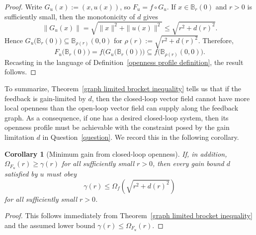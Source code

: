 \documentclass[pdflatex,sn-mathphys-num]{sn-jnl}%
\theoremstyle{thmstyleone}%
\newtheorem{corollary}[theorem]{Corollary}
\theoremstyle{thmstyletwo}%
\theoremstyle{thmstylethree}%
\begin{document}
    
    
    \begin{proof}
        Write $G_u(x):=(x,u(x))$, so $F_u=f \circ G_u$.  If $x \in \mathbb{B}_r(0)$ and $r>0$ is sufficiently small, then the monotonicity of $d$ gives
        \[
            \|G_u(x)\|=\sqrt{\|x\|^2+\|u(x)\|^2}\leq \sqrt{r^2+d(r)^2}.
        \]
        Hence $G_u\big(\mathbb{B}_r(0)\big) \subseteq \mathbb{B}_{\rho(r)}(0,0)$ for $\rho(r):=\sqrt{r^2+d(r)^2}$.  Therefore,
        \[
            F_u\big(\mathbb{B}_r(0)\big)=f\big(G_u\big(\mathbb{B}_r(0)\big)\big) \subseteq f\big(\mathbb{B}_{\rho(r)}(0,0)\big).
        \]
        Recasting in the language of Definition~\ref{openness profile definition}, the result follows.
    \end{proof}
    

    To summarize, Theorem~\ref{graph limited brocket inequality} tells us that if the feedback is gain-limited by $d$, then the closed-loop vector field cannot have more local openness than the open-loop vector field can supply along the feedback graph. As a consequence, if one has a desired closed-loop system, then its openness profile must be achievable with the constraint posed by the gain limitation $d$ in Question~\ref{question}.  We record this in the following corollary.
    
    
    \begin{corollary}[Minimum gain from closed-loop openness]\label{minimum gain from closed-loop openness}
        If, in addition, $\Omega_{F_u}(r)\geq \gamma(r)$ for all sufficiently small $r>0$, then every gain bound $d$ satisfied by $u$ must obey
        \begin{equation}\label{minimum gain inequality}
            \gamma(r) \leq \Omega_f\left(\sqrt{r^2+d(r)^2}\right)
        \end{equation}
        for all sufficiently small $r>0$.
    \end{corollary}


    \begin{proof}
        This follows immediately from Theorem~\ref{graph limited brocket inequality} and the assumed lower bound $\gamma(r)\leq \Omega_{F_u}(r)$.
    \end{proof}
\end{document}
